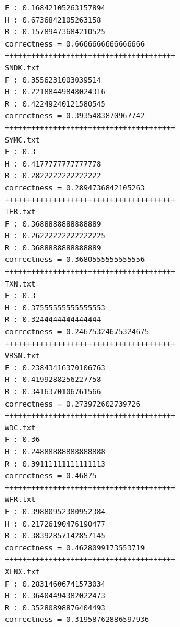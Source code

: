 \documentclass{llncs}
\begin{document}
\begin{verbatim}
F : 0.16842105263157894
H : 0.6736842105263158
R : 0.15789473684210525
correctness = 0.6666666666666666
+++++++++++++++++++++++++++++++++++++++
SNDK.txt
F : 0.3556231003039514
H : 0.22188449848024316
R : 0.42249240121580545
correctness = 0.3935483870967742
+++++++++++++++++++++++++++++++++++++++
SYMC.txt
F : 0.3
H : 0.4177777777777778
R : 0.2822222222222222
correctness = 0.2894736842105263
+++++++++++++++++++++++++++++++++++++++
TER.txt
F : 0.3688888888888889
H : 0.26222222222222225
R : 0.3688888888888889
correctness = 0.3680555555555556
+++++++++++++++++++++++++++++++++++++++
TXN.txt
F : 0.3
H : 0.37555555555555553
R : 0.3244444444444444
correctness = 0.24675324675324675
+++++++++++++++++++++++++++++++++++++++
VRSN.txt
F : 0.23843416370106763
H : 0.4199288256227758
R : 0.3416370106761566
correctness = 0.273972602739726
+++++++++++++++++++++++++++++++++++++++
WDC.txt
F : 0.36
H : 0.24888888888888888
R : 0.39111111111111113
correctness = 0.46875
+++++++++++++++++++++++++++++++++++++++
WFR.txt
F : 0.39880952380952384
H : 0.21726190476190477
R : 0.38392857142857145
correctness = 0.4628099173553719
+++++++++++++++++++++++++++++++++++++++
XLNX.txt
F : 0.28314606741573034
H : 0.36404494382022473
R : 0.35280898876404493
correctness = 0.31958762886597936
\end{verbatim}
\end{document}
